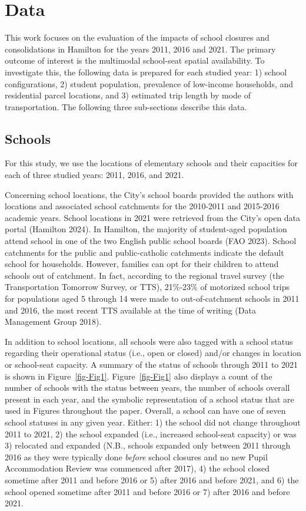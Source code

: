 \documentclass[
default
]{sn-jnl}
\begin{document}
\section{Data}\label{data}

This work focuses on the evaluation of the impacts of school closures
and consolidations in Hamilton for the years 2011, 2016 and 2021. The
primary outcome of interest is the multimodal school-seat spatial
availability. To investigate this, the following data is prepared for
each studied year: 1) school configurations, 2) student population,
prevalence of low-income households, and residential parcel locations,
and 3) estimated trip length by mode of transportation. The following
three sub-sections describe this data.

\subsection{Schools}\label{schools}

For this study, we use the locations of elementary schools and their
capacities for each of three studied years: 2011, 2016, and 2021.

Concerning school locations, the City's school boards provided the
authors with locations and associated school catchments for the
2010-2011 and 2015-2016 academic years. School locations in 2021 were
retrieved from the City's open data portal (Hamilton 2024). In Hamilton,
the majority of student-aged population attend school in one of the two
English public school boards (FAO 2023). School catchments for the
public and public-catholic catchments indicate the default school for
households. However, families can opt for their children to attend
schools out of catchment. In fact, according to the regional travel
survey (the Transportation Tomorrow Survey, or TTS), 21\%-23\% of
motorized school trips for populations aged 5 through 14 were made to
out-of-catchment schools in 2011 and 2016, the most recent TTS available
at the time of writing (Data Management Group 2018).

In addition to school locations, all schools were also tagged with a
school status regarding their operational status (i.e., open or closed)
and/or changes in location or school-seat capacity. A summary of the
status of schools through 2011 to 2021 is shown in
Figure~\ref{fig-Fig1}. Figure~\ref{fig-Fig1} also displays a count of
the number of schools with the status between years, the number of
schools overall present in each year, and the symbolic representation of
a school status that are used in Figures throughout the paper. Overall,
a school can have one of seven school statuses in any given year.
Either: 1) the school did not change throughout 2011 to 2021, 2) the
school expanded (i.e., increased school-seat capacity) or was 3)
relocated and expanded (N.B., schools expanded only between 2011 through
2016 as they were typically done \emph{before} school closures and no
new Pupil Accommodation Review was commenced after 2017), 4) the school
closed sometime after 2011 and before 2016 or 5) after 2016 and before
2021, and 6) the school opened sometime after 2011 and before 2016 or 7)
after 2016 and before 2021.
\end{document}
